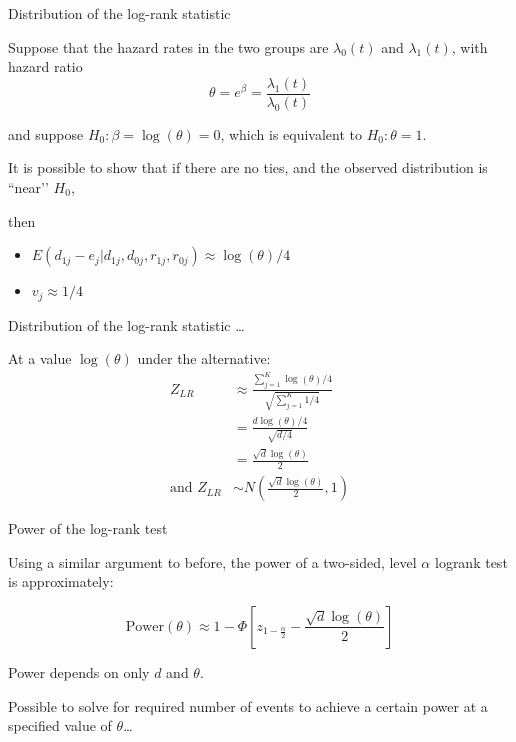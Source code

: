 \documentclass[ignorenonframetext,]{beamer}
\begin{document}
\begin{frame}{%
\protect\hypertarget{distribution-of-the-log-rank-statistic}{%
Distribution of the log-rank statistic}}

Suppose that the hazard rates in the two groups are \(\lambda_0(t)\) and
\(\lambda_1(t)\), with hazard ratio
\[  \theta= e^\beta = \frac{\lambda_1(t)}{\lambda_0(t)} \]

and suppose \(H_0: \beta=\log(\theta)=0\), which is equivalent to
\(H_0: \theta=1\).

It is possible to show that if there are no ties, and the observed
distribution is ``near’’ \(H_0\),

then

\begin{itemize}
\item
  \(E(d_{1j} - e_j | d_{1j}, d_{0j}, r_{1j}, r_{0j}) \approx \log(\theta)/4\)
\item
  \(v_j \approx 1/4\)
\end{itemize}

\end{frame}

\begin{frame}{%
\protect\hypertarget{distribution-of-the-log-rank-statistic-1}{%
Distribution of the log-rank statistic \ldots}}

At a value \(\log(\theta)\) under the alternative: \begin{align*} 
Z_{LR} &\approx  \frac{\sum_{j=1}^K \log(\theta)/4}{\sqrt{\sum_{j=1}^K 1/4}}\\[1ex]
&=\frac{d \log(\theta)/4}{\sqrt{d/4}}\\[1ex]
&= \frac{\sqrt{d} \log(\theta)}{2}\\[1ex]
\text{and } Z_{LR}  &\sim  N(\frac{\sqrt{d} \log(\theta)}{2},1) 
\end{align*}

\end{frame}

\begin{frame}{%
\protect\hypertarget{power-of-the-log-rank-test}{%
Power of the log-rank test}}

Using a similar argument to before, the power of a two-sided, level
\(\alpha\) logrank test is approximately:

\[ \text{Power} (\theta) \approx 
1 - \Phi\left[z_{1- \frac{\alpha}{2}} - \frac{\sqrt{d} \log(\theta)}{2} \right]  \]

Power depends on only \(d\) and \(\theta\).

\vspace{0.3in}

Possible to solve for required number of events to achieve a certain
power at a specified value of \(\theta\)\ldots

\end{frame}
\end{document}
